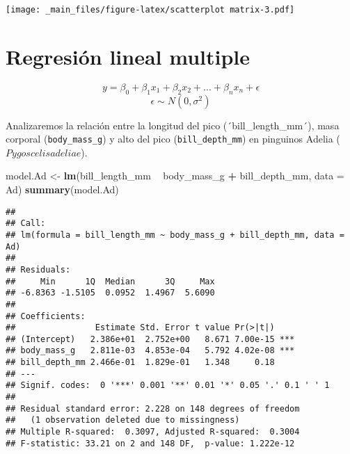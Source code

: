 \documentclass[
]{book}
\newenvironment{Shaded}{\begin{snugshade}}{\end{snugshade}}
\newcommand{\DataTypeTok}[1]{\textcolor[rgb]{0.13,0.29,0.53}{#1}}
\newcommand{\DecValTok}[1]{\textcolor[rgb]{0.00,0.00,0.81}{#1}}
\newcommand{\KeywordTok}[1]{\textcolor[rgb]{0.13,0.29,0.53}{\textbf{#1}}}
\newcommand{\NormalTok}[1]{#1}
\newcommand{\OperatorTok}[1]{\textcolor[rgb]{0.81,0.36,0.00}{\textbf{#1}}}
\newcommand{\StringTok}[1]{\textcolor[rgb]{0.31,0.60,0.02}{#1}}
\begin{document}
\texttt{[image: \_main\_files/figure-latex/scatterplot matrix-3.pdf]}

\hypertarget{regresiuxf3n-lineal-multiple}{%
\section{Regresión lineal multiple}\label{regresiuxf3n-lineal-multiple}}

\[y = \beta_0 + \beta_1 x_1 + \beta_2 x_2 + ... + \beta_n x_n + \epsilon\]
\[\epsilon \sim N(0, \sigma^2)\]

Analizaremos la relación entre la longitud del pico (´bill\_length\_mm´), masa corporal (\texttt{body\_mass\_g}) y alto del pico (\texttt{bill\_depth\_mm}) en pinguinos Adelia (\(Pygoscelis adeliae\)).

\begin{Shaded}
\begin{Highlighting}[]
\NormalTok{model.Ad <-}\StringTok{ }\KeywordTok{lm}\NormalTok{(bill_length_mm }\OperatorTok{~}\StringTok{ }\NormalTok{body_mass_g }\OperatorTok{+}\StringTok{ }\NormalTok{bill_depth_mm, }\DataTypeTok{data =}\NormalTok{ Ad)}
\KeywordTok{summary}\NormalTok{(model.Ad)}
\end{Highlighting}
\end{Shaded}

\begin{verbatim}
## 
## Call:
## lm(formula = bill_length_mm ~ body_mass_g + bill_depth_mm, data = Ad)
## 
## Residuals:
##     Min      1Q  Median      3Q     Max 
## -6.8363 -1.5105  0.0952  1.4967  5.6090 
## 
## Coefficients:
##                Estimate Std. Error t value Pr(>|t|)    
## (Intercept)   2.386e+01  2.752e+00   8.671 7.00e-15 ***
## body_mass_g   2.811e-03  4.853e-04   5.792 4.02e-08 ***
## bill_depth_mm 2.466e-01  1.829e-01   1.348     0.18    
## ---
## Signif. codes:  0 '***' 0.001 '**' 0.01 '*' 0.05 '.' 0.1 ' ' 1
## 
## Residual standard error: 2.228 on 148 degrees of freedom
##   (1 observation deleted due to missingness)
## Multiple R-squared:  0.3097, Adjusted R-squared:  0.3004 
## F-statistic: 33.21 on 2 and 148 DF,  p-value: 1.222e-12
\end{verbatim}

\begin{Shaded}
\end{Shaded}
\end{document}
